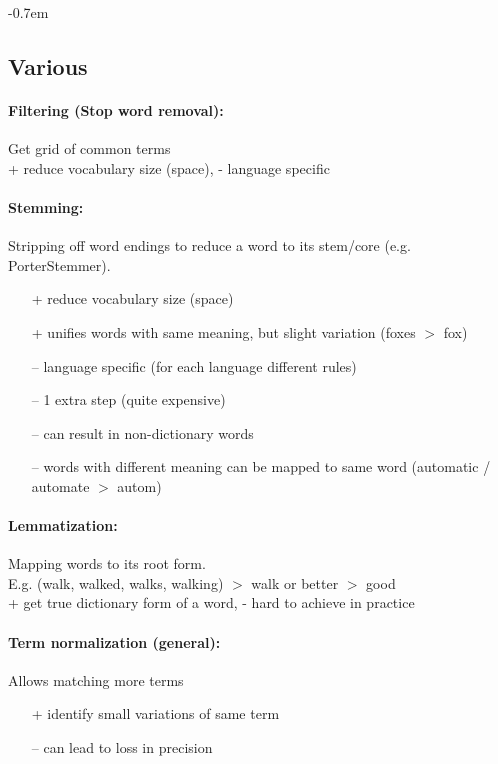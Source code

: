 \documentclass[a4paper,11pt]{article}
\begin{document}
\raggedright
\lsstyle
\small
\setlength{\columnseprule}{0.1mm}
\abovedisplayskip=0pt
\belowdisplayskip=0cm
\allowdisplaybreaks
\itemsep-0.7em

\begin{multicols}{2}

\section{Various}
\paragraph{Filtering (Stop word removal):} Get grid of common terms\\
+ reduce vocabulary size (space), - language specific

\paragraph{Stemming:} Stripping off word endings to reduce a word to its stem/core (e.g. PorterStemmer).
\begin{itemize}[leftmargin=0.3cm]
  \item [+] reduce vocabulary size (space)
  \item [+] unifies words with same meaning, but slight variation (foxes $>$ fox)
  \item [--] language specific (for each language different rules)
  \item [--] 1 extra step (quite expensive)
  \item [--] can result in non-dictionary words
  \item [--] words with different meaning can be mapped to same word (automatic / automate $>$ autom)
\end{itemize}

\paragraph{Lemmatization:} Mapping words to its root form. \\
E.g. (walk, walked, walks, walking) $>$ walk or better $>$ good\\
+ get true dictionary form of a word, - hard to achieve in practice

\paragraph{Term normalization (general):} Allows matching more terms\\
\begin{itemize}[leftmargin=0.3cm]
  \item [+] identify small variations of same term
  \item [--] can lead to loss in precision
\end{itemize}


\end{multicols}
\end{document}
